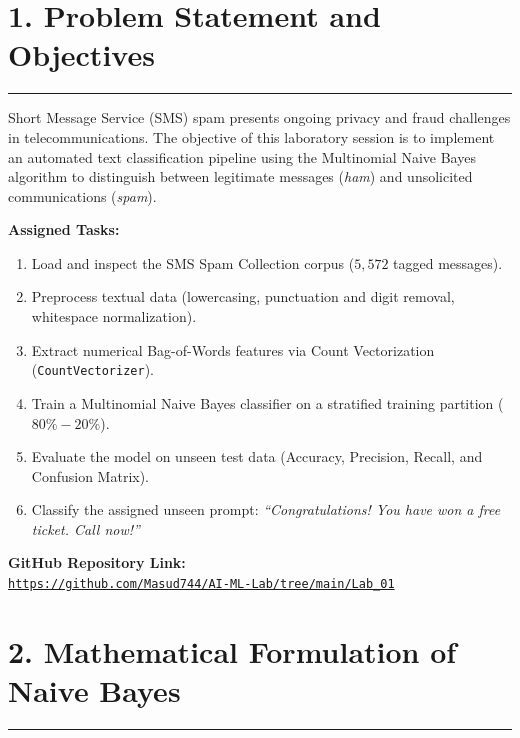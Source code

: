 \documentclass[11pt,a4paper]{article}
\begin{document}
\newpage
{}

\section*{1. Problem Statement and Objectives}
\noindent\rule{\textwidth}{0.5pt}\vspace{0.08cm}

Short Message Service (SMS) spam presents ongoing privacy and fraud challenges in telecommunications. The objective of this laboratory session is to implement an automated text classification pipeline using the Multinomial Naive Bayes algorithm to distinguish between legitimate messages (\textit{ham}) and unsolicited communications (\textit{spam}).

\vspace{0.06cm}
\noindent\textbf{Assigned Tasks:}
\begin{enumerate}
    \setlength{\itemsep}{0pt}
    \setlength{\parskip}{0pt}
    \item Load and inspect the SMS Spam Collection corpus ($5,572$ tagged messages).
    \item Preprocess textual data (lowercasing, punctuation and digit removal, whitespace normalization).
    \item Extract numerical Bag-of-Words features via Count Vectorization (\texttt{CountVectorizer}).
    \item Train a Multinomial Naive Bayes classifier on a stratified training partition ($80\%-20\%$).
    \item Evaluate the model on unseen test data (Accuracy, Precision, Recall, and Confusion Matrix).
    \item Classify the assigned unseen prompt: \textit{``Congratulations! You have won a free ticket. Call now!''}
\end{enumerate}

\vspace{0.04cm}
\noindent\textbf{GitHub Repository Link:}\\
\href{https://github.com/Masud744/AI-ML-Lab/tree/main/Lab_01}{\texttt{https://github.com/Masud744/AI-ML-Lab/tree/main/Lab\_01}}\vspace{0.12cm}

\section*{2. Mathematical Formulation of Naive Bayes}
\noindent\rule{\textwidth}{0.5pt}\vspace{0.06cm}
\end{document}
